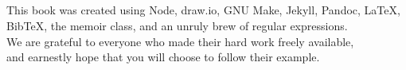 \documentclass[10pt,statementpaper]{memoir}
\begin{document}
\pagestyle{empty}

{\begingroup
  \raggedleft
  \vspace*{\baselineskip}
  
\endgroup}

\newpage
\pagestyle{empty}

~

\newpage
{}
\tableofcontents

\newpage
\pagestyle{empty}

~

\newpage
\listoffigures

\newpage
\pagestyle{empty}

~

\newpage
\listoftables

\newpage
\pagestyle{empty}

~

\newpage
\pagestyle{plain}



\cleartoverso
{\begingroup
  \raggedleft
  \vspace*{4\baselineskip}
  This book was created using Node, draw.io, GNU Make, Jekyll, Pandoc, LaTeX, BibTeX, the memoir class,
  and an unruly brew of regular expressions. \\
  We are grateful to everyone who made their hard work freely available, \\
  and earnestly hope that you will choose to follow their example.

\endgroup}
\end{document}
